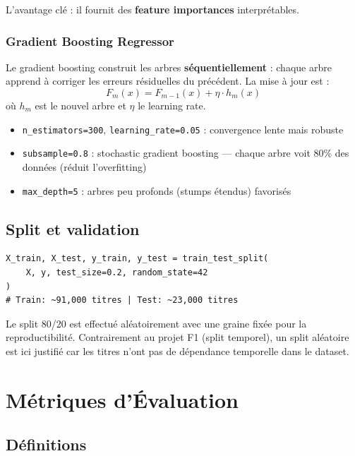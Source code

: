 \documentclass[12pt, a4paper]{article}
\begin{document}
L'avantage clé : il fournit des \textbf{feature importances} interprétables.

\subsubsection{Gradient Boosting Regressor}

Le gradient boosting construit les arbres \textbf{séquentiellement} : chaque arbre
apprend à corriger les erreurs résiduelles du précédent. La mise à jour est :
\[
  F_m(x) = F_{m-1}(x) + \eta \cdot h_m(x)
\]
où $h_m$ est le nouvel arbre et $\eta$ le learning rate.

\begin{itemize}[leftmargin=1.5cm]
  \item \texttt{n\_estimators=300}, \texttt{learning\_rate=0.05} : convergence lente
        mais robuste
  \item \texttt{subsample=0.8} : stochastic gradient boosting — chaque arbre voit 80\%
        des données (réduit l'overfitting)
  \item \texttt{max\_depth=5} : arbres peu profonds (stumps étendus) favorisés
\end{itemize}

\subsection{Split et validation}

\begin{codebox}
\begin{lstlisting}
X_train, X_test, y_train, y_test = train_test_split(
    X, y, test_size=0.2, random_state=42
)
# Train: ~91,000 titres | Test: ~23,000 titres
\end{lstlisting}
\end{codebox}

Le split 80/20 est effectué aléatoirement avec une graine fixée pour la reproductibilité.
Contrairement au projet F1 (split temporel), un split aléatoire est ici justifié car
les titres n'ont pas de dépendance temporelle dans le dataset.

\section{Métriques d'Évaluation}

\subsection{Définitions}
\end{document}
